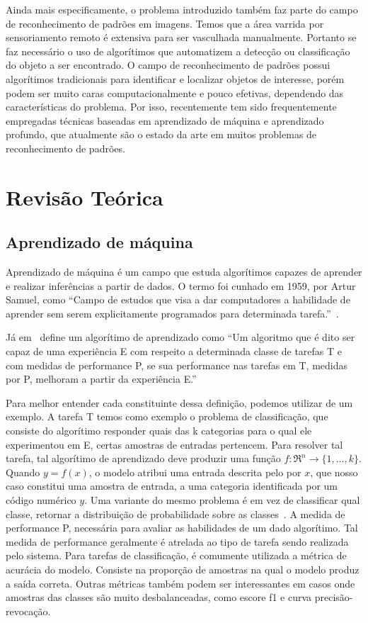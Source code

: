 Ainda mais especificamente, o problema introduzido também faz parte do campo de reconhecimento de padrões em imagens. Temos que a área varrida por sensoriamento remoto é extensiva para ser vasculhada manualmente. Portanto se faz necessário o uso de algorítimos que automatizem a detecção ou classificação do objeto a ser encontrado.
O campo de reconhecimento de padrões possui algorítimos tradicionais para identificar e localizar objetos de interesse, porém podem ser muito caras computacionalmente e pouco efetivas, dependendo das características do problema. Por isso, recentemente tem sido frequentemente empregadas técnicas baseadas em aprendizado de máquina e aprendizado profundo, que atualmente são o estado da arte em muitos problemas de reconhecimento de padrões.


\section{Revisão Teórica}\label{sec:Cap2_revisao_teorica}

\subsection{Aprendizado de máquina}\label{sec:aprendizado_maquina}

Aprendizado de máquina é um campo que estuda algorítimos capazes de aprender e realizar inferências a partir de dados. O termo foi cunhado em 1959, por Artur Samuel, como “Campo de estudos que visa a dar computadores a habilidade de aprender sem serem explicitamente programados para determinada tarefa.”~\cite{Samuel1959SomeSI}.

Já em~\cite{Mitchell97} define um algorítimo de aprendizado como “Um algoritmo que é dito ser capaz de uma experiência E com respeito a determinada classe de tarefas T e com medidas de performance P, se sua performance nas tarefas em T, medidas por P, melhoram a partir da experiência E.”

Para melhor entender cada constituinte dessa definição, podemos utilizar de um exemplo. A tarefa T temos como exemplo o problema de classificação, que consiste do algorítimo responder quais das k categorias para o qual ele experimentou em E, certas amostras de entradas pertencem. Para resolver tal tarefa, tal algorítimo de aprendizado deve produzir uma função \(f:\Re^n\rightarrow \{1,\ldots,k\}\). Quando \( y=f(x) \), o modelo atribui uma entrada descrita pelo por \(x\), que nosso caso constitui uma amostra de entrada, a uma categoria identificada por um código numérico \(y\). Uma variante do mesmo problema é em vez de classificar qual classe, retornar a distribuição de probabilidade sobre as classes~\cite{GoodBengCour16}. A medida de performance P, necessária para avaliar as habilidades de um dado algorítimo. Tal medida de performance geralmente é atrelada ao tipo de tarefa sendo realizada pelo sistema. Para tarefas de classificação, é comumente utilizada a métrica de acurácia do modelo. Consiste na proporção de amostras na qual o modelo produz a saída correta. Outras métricas também podem ser interessantes em casos onde amostras das classes são muito desbalanceadas, como escore f1 e curva precisão-revocação.


